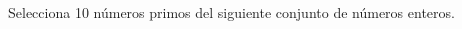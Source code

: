 Selecciona 10 n\'umeros primos del siguiente conjunto de n\'umeros enteros.
\begin{multicols}{6}
    \begin{checkboxes}
    \end{checkboxes}
\end{multicols}